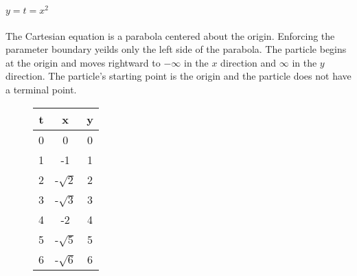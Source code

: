 \documentclass[12pt]{article}
\begin{document}
\noindent$y = t = x^{2}$\\\\
The Cartesian equation is a parabola centered about the origin.
Enforcing the parameter boundary yeilds only the left side of the parabola.
The particle begins at the origin and moves rightward to $-\infty$ in the $x$ direction 
and $\infty$ in the $y$ direction.
The particle's starting point is the origin and the particle does not have a 
terminal point.\\
\begin{minipage}{\linewidth}
      \centering
      \begin{minipage}{0.45\linewidth}
          \begin{figure}[H]




          \end{figure}
      \end{minipage}
      \hspace{0.05\linewidth}
      \begin{minipage}{0.45\linewidth}
          \begin{figure}[H]



\noindent\begin{tabular}{c|c|c}
\textbf{t} & \textbf{x} & \textbf{y} \\ \hline
	0&0&0\\
	1&-1&1\\
	2&-$\sqrt{2}$&2\\
	3&-$\sqrt{3}$&3\\
	4&-$2$&4\\
	5&-$\sqrt{5}$&5\\
	6&-$\sqrt{6}$&6\\
\end{tabular}\\

          \end{figure}
      \end{minipage}
  \end{minipage}\pagebreak
\end{document}
